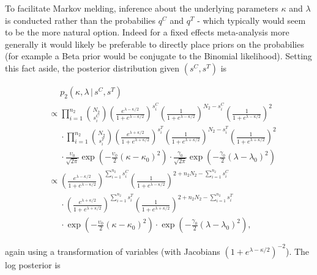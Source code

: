 \documentclass[11pt,]{book}
\begin{document}
To facilitate Markov melding, inference about the underlying parameters
\(\kappa\) and \(\lambda\) is conducted rather than the probabilies
\(q^C\) and \(q^T\) - which typically would seem to be the more natural
option. Indeed for a fixed effects meta-analysis more generally it would
likely be preferable to directly place priors on the probabilies (for
example a Beta prior would be conjugate to the Binomial likelihood).
Setting this fact aside, the posterior distribution given \((s^C, s^T)\)
is

\begin{align}
&\phantom{\propto} p_2(\kappa, \lambda \, | \, s^C, s^T) \nonumber \\
&\propto \prod_{i = 1}^{n_2} {N_2\choose s_i^C} \left(\frac{e^{\lambda - \kappa/2}}{1 + e^{\lambda - \kappa/2}}\right)^{s_i^C} \left(\frac{1}{1 + e^{\lambda - \kappa/2}}\right)^{N_2 - s_i^C} \left(\frac{1}{1 + e^{\lambda - \kappa/2}}\right)^2 \nonumber \\
&\phantom{\propto} \cdot \prod_{i = 1}^{n_2} {N_2\choose s_i^T} \left(\frac{e^{\lambda + \kappa/2}}{1 + e^{\lambda + \kappa/2}}\right)^{s_i^T} \left(\frac{1}{1 + e^{\lambda + \kappa/2}}\right)^{N_2 - s_i^T} \left(\frac{1}{1 + e^{\lambda + \kappa/2}}\right)^2 \nonumber \\
&\phantom{\propto} \cdot \frac{\upsilon_0}{\sqrt{2\pi}} \exp\left(-\frac{\upsilon_0}{2}(\kappa - \kappa_0)^2\right) \cdot \frac{\gamma_0}{\sqrt{2\pi}} \exp\left(-\frac{\gamma_0}{2}(\lambda - \lambda_0)^2\right) \nonumber \\
&\propto \left(\frac{e^{\lambda - \kappa/2}}{1 + e^{\lambda - \kappa/2}}\right)^{\sum_{i = 1}^{n_2} s_i^C} \left(\frac{1}{1 + e^{\lambda - \kappa/2}}\right)^{2 + n_2N_2 - \sum_{i = 1}^{n_2} s_i^C} \nonumber \\
&\phantom{\propto}  \cdot \left(\frac{e^{\lambda + \kappa/2}}{1 + e^{\lambda + \kappa/2}}\right)^{\sum_{i = 1}^{n_2} s_i^T} \left(\frac{1}{1 + e^{\lambda + \kappa/2}}\right)^{2 + n_2N_2 - \sum_{i = 1}^{n_2} s_i^T} \nonumber \\
&\phantom{\propto} \cdot  \exp\left(-\frac{\upsilon_0}{2}(\kappa - \kappa_0)^2\right) \cdot \exp\left(-\frac{\gamma_0}{2}(\lambda - \lambda_0)^2\right),
\end{align}

again using a transformation of variables (with Jacobians
\((1 + e^{\lambda - \kappa/2})^{-2}\)). The log posterior is
\end{document}
